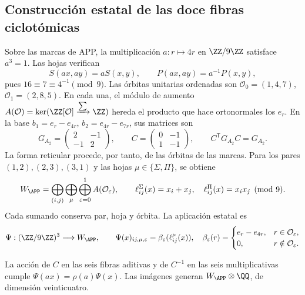 \subsection{Construcción estatal de las doce fibras ciclotómicas}
\label{x_reciprocidad:nuclear:fibras-app-witt}
Sobre las marcas de APP, la multiplicación \(a:r\mapsto4r\) en
\(\ZZ/9\ZZ\) satisface \(a^3=1\). Las hojas verifican
\[
 S(ax,ay)=aS(x,y),\qquad P(ax,ay)=a^{-1}P(x,y),
\]
pues \(16\equiv7\equiv4^{-1}\pmod9\). Las órbitas unitarias
ordenadas son \(\mathcal O_0=(1,4,7)\), \(\mathcal O_1=(2,8,5)\).
En cada una, el módulo de aumento
\(A(\mathcal O)=\ker(\ZZ[\mathcal O]\xrightarrow{\sum}\ZZ)\)
hereda el producto que hace ortonormales los \(e_r\). En la base
\(b_1=e_r-e_{4r}\), \(b_2=e_{4r}-e_{7r}\), sus matrices son
\[
 G_{A_2}=\begin{pmatrix}2&-1\\-1&2\end{pmatrix},\qquad
 C=\begin{pmatrix}0&-1\\1&-1\end{pmatrix},\qquad
 C^{\mathsf T}G_{A_2}C=G_{A_2}.
\]
La forma reticular procede, por tanto, de las órbitas de las marcas.
Para los pares \((1,2),(2,3),(3,1)\) y las hojas
\(\mu\in\{\Sigma,\Pi\}\), se obtiene
\[
 W_{\APP}=\bigoplus_{(i,j)}\bigoplus_\mu\bigoplus_{\varepsilon=0}^1
 A(\mathcal O_\varepsilon),\qquad
 \ell^\Sigma_{ij}(x)=x_i+x_j,\quad
 \ell^\Pi_{ij}(x)=x_ix_j\pmod9.
\]
Cada sumando conserva par, hoja y órbita. La aplicación estatal es
\[
 \Psi:(\ZZ/9\ZZ)^3\longrightarrow W_{\APP},\qquad
 \Psi(x)_{ij,\mu,\varepsilon}=\beta_\varepsilon(\ell^\mu_{ij}(x)),
 \quad
 \beta_\varepsilon(r)=
 \begin{cases}e_r-e_{4r},&r\in\mathcal O_\varepsilon,\\0,&r\notin\mathcal O_\varepsilon.
 \end{cases}
\]
\begin{proposition}
\label{x_reciprocidad:nuclear:psi-rango}
La acción de \(C\) en las seis fibras aditivas y de \(C^{-1}\) en
las seis multiplicativas cumple \(\Psi(ax)=\rho(a)\Psi(x)\).
Las imágenes generan \(W_{\APP}\otimes\QQ\), de dimensión veinticuatro.
\end{proposition}
